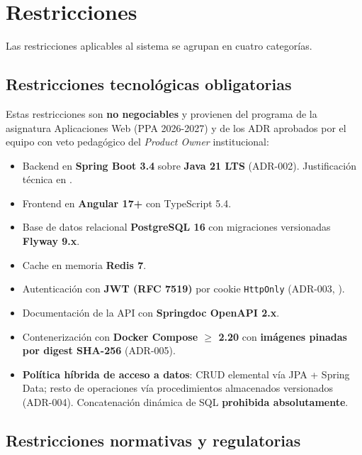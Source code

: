 \documentclass[11pt,a4paper,twoside]{report}
\begin{document}
\section{Restricciones}
\label{sec:restricciones}

Las restricciones aplicables al sistema se agrupan en cuatro categor\'ias.

\subsection{Restricciones tecnol\'ogicas obligatorias}

Estas restricciones son \textbf{no negociables} y provienen del programa de la asignatura Aplicaciones Web (PPA 2026-2027) y de los ADR aprobados por el equipo con veto pedag\'ogico del \emph{Product Owner} institucional:

\begin{itemize}[leftmargin=1.5em,itemsep=2pt]
    \item Backend en \textbf{Spring Boot 3.4} sobre \textbf{Java 21 LTS} (ADR-002). Justificaci\'on t\'ecnica en \cite{walls2022spring}.
    \item Frontend en \textbf{Angular 17+} con TypeScript 5.4.
    \item Base de datos relacional \textbf{PostgreSQL 16} con migraciones versionadas \textbf{Flyway 9.x}.
    \item Cache en memoria \textbf{Redis 7}.
    \item Autenticaci\'on con \textbf{JWT (RFC 7519)} por cookie \texttt{HttpOnly} (ADR-003, \cite{jones2015jwt}).
    \item Documentaci\'on de la API con \textbf{Springdoc OpenAPI 2.x}.
    \item Contenerizaci\'on con \textbf{Docker Compose $\geq$ 2.20} con \textbf{im\'agenes pinadas por digest SHA-256} (ADR-005).
    \item \textbf{Pol\'itica h\'ibrida de acceso a datos}: CRUD elemental v\'ia JPA + Spring Data; resto de operaciones v\'ia procedimientos almacenados versionados (ADR-004). Concatenaci\'on din\'amica de SQL \textbf{prohibida absolutamente}.
\end{itemize}

\subsection{Restricciones normativas y regulatorias}
\end{document}
